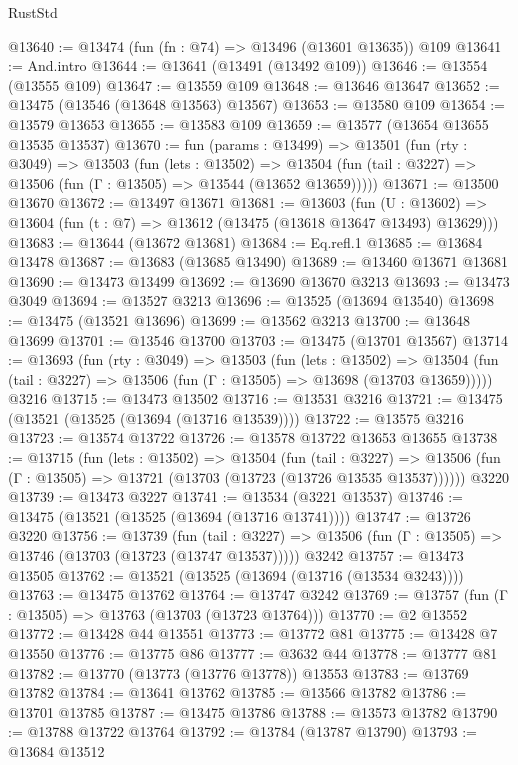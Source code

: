 \begin{lexlean}{RustStd}
\begin{coremodule}
{\begin{coremodule}
{{{{{{{{{{{{{{{{{{{{{{{{{{{{{{{{{{{{{@13640 := @13474 (fun (fn : @74) => @13496 (@13601 @13635)) @109
@13641 := And.intro
@13644 := @13641 (@13491 (@13492 @109))
@13646 := @13554 (@13555 @109)
@13647 := @13559 @109
@13648 := @13646 @13647
@13652 := @13475 (@13546 (@13648 @13563) @13567)
@13653 := @13580 @109
@13654 := @13579 @13653
@13655 := @13583 @109
@13659 := @13577 (@13654 @13655 @13535 @13537)
@13670 := fun (params : @13499) =>
  @13501
    (fun (rty : @3049) =>
    @13503
      (fun (lets : @13502) =>
      @13504 (fun (tail : @3227) => @13506 (fun (Γ : @13505) => @13544 (@13652 @13659)))))
@13671 := @13500 @13670
@13672 := @13497 @13671
@13681 := @13603
    (fun (U : @13602) => @13604 (fun (t : @7) => @13612 (@13475 (@13618 @13647 @13493) @13629)))
@13683 := @13644 (@13672 @13681)
@13684 := Eq.refl.{1}
@13685 := @13684 @13478
@13687 := @13683 (@13685 @13490)
@13689 := @13460 @13671 @13681
@13690 := @13473 @13499
@13692 := @13690 @13670 @3213
@13693 := @13473 @3049
@13694 := @13527 @3213
@13696 := @13525 (@13694 @13540)
@13698 := @13475 (@13521 @13696)
@13699 := @13562 @3213
@13700 := @13648 @13699
@13701 := @13546 @13700
@13703 := @13475 (@13701 @13567)
@13714 := @13693
    (fun (rty : @3049) =>
    @13503
      (fun (lets : @13502) =>
      @13504 (fun (tail : @3227) => @13506 (fun (Γ : @13505) => @13698 (@13703 @13659)))))
    @3216
@13715 := @13473 @13502
@13716 := @13531 @3216
@13721 := @13475 (@13521 (@13525 (@13694 (@13716 @13539))))
@13722 := @13575 @3216
@13723 := @13574 @13722
@13726 := @13578 @13722 @13653 @13655
@13738 := @13715
    (fun (lets : @13502) =>
    @13504
      (fun (tail : @3227) =>
      @13506 (fun (Γ : @13505) => @13721 (@13703 (@13723 (@13726 @13535 @13537))))))
    @3220
@13739 := @13473 @3227
@13741 := @13534 (@3221 @13537)
@13746 := @13475 (@13521 (@13525 (@13694 (@13716 @13741))))
@13747 := @13726 @3220
@13756 := @13739
    (fun (tail : @3227) => @13506 (fun (Γ : @13505) => @13746 (@13703 (@13723 (@13747 @13537)))))
    @3242
@13757 := @13473 @13505
@13762 := @13521 (@13525 (@13694 (@13716 (@13534 @3243))))
@13763 := @13475 @13762
@13764 := @13747 @3242
@13769 := @13757 (fun (Γ : @13505) => @13763 (@13703 (@13723 @13764)))
@13770 := @2 @13552
@13772 := @13428 @44 @13551
@13773 := @13772 @81
@13775 := @13428 @7 @13550
@13776 := @13775 @86
@13777 := @3632 @44
@13778 := @13777 @81
@13782 := @13770 (@13773 (@13776 @13778)) @13553
@13783 := @13769 @13782
@13784 := @13641 @13762
@13785 := @13566 @13782
@13786 := @13701 @13785
@13787 := @13475 @13786
@13788 := @13573 @13782
@13790 := @13788 @13722 @13764
@13792 := @13784 (@13787 @13790)
@13793 := @13684 @13512
}}}}}}}}}}}}}}}}}}}}}}}}}}}}}}}}}}}}}
\end{coremodule}}
\end{coremodule}
\end{lexlean}
